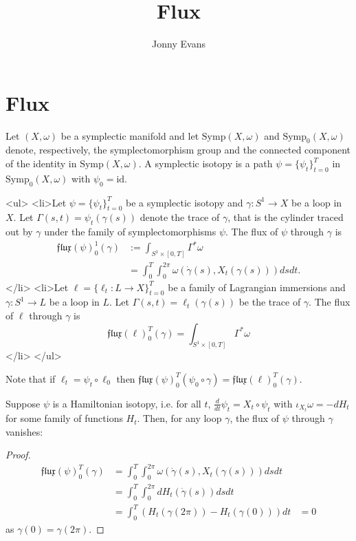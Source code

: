 \documentclass{article}
\title{Flux}
\author{Jonny Evans}
\begin{document}
\section{Flux}

Let $(X,\omega)$ be a symplectic manifold and let $\mathrm{Symp}(X,\omega)$ and $\mathrm{Symp}_0(X,\omega)$ denote, respectively, the symplectomorphism group and the connected component of the identity in $\mathrm{Symp}(X,\omega)$. A symplectic isotopy is a path $\psi=\{\psi_t\}_{t=0}^T$ in $\mathrm{Symp}_0(X,\omega)$ with $\psi_0=\mathrm{id}$.

\begin{Definition}
  <ul>
  <li>Let $\psi=\{\psi_t\}_{t=0}^T$ be a symplectic isotopy and $\gamma\colon S^1\to X$ be a loop in $X$. Let $\Gamma(s,t)=\psi_t(\gamma(s))$ denote the trace of $\gamma$, that is the cylinder traced out by $\gamma$ under the family of symplectomorphisms $\psi$. The flux of $\psi$ through $\gamma$ is
      \[\begin{align*}
        \mathfrak{flux}(\psi)_0^1(\gamma)&:=\int_{S^1\times[0,T]}\Gamma^*\omega\\
        &=\int_0^T\int_0^{2\pi}\omega(\dot{\gamma}(s),X_t(\gamma(s)))ds dt.
      \end{align*}\]
      </li>
      <li>Let $\ell=\{\ell_t\colon L\to X\}_{t=0}^T$ be a family of Lagrangian immersions and $\gamma\colon S^1\to L$ be a loop in $L$. Let $\Gamma(s,t)=\ell_t(\gamma(s))$ be the trace of $\gamma$. The flux of $\ell$ through $\gamma$ is
      \[\mathfrak{flux}(\ell)_0^T(\gamma)=\int_{S^1\times[0,T]}\Gamma^*\omega\]
      </li>
      </ul>
\end{Definition}

Note that if $\ell_t=\psi_t\circ\ell_0$ then $\mathfrak{flux}(\psi)_0^T(\psi_0\circ\gamma)=\mathfrak{flux}(\ell)_0^T(\gamma)$.

\begin{Lemma}
  Suppose $\psi$ is a Hamiltonian isotopy, i.e. for all $t$, $\frac{d}{dt}\psi_t=X_t\circ\psi_t$ with $\iota_{X_t}\omega=-dH_t$ for some family of functions $H_t$. Then, for any loop $\gamma$, the flux of $\psi$ through $\gamma$ vanishes:
\end{Lemma}
\begin{proof}
  \begin{align*}
    \mathfrak{flux}(\psi)_0^T(\gamma)&=\int_0^T\int_0^{2\pi}\omega(\dot{\gamma}(s),X_t(\gamma(s)))ds dt\\
    &=\int_0^T\int_0^{2\pi}dH_t(\dot{\gamma}(s))dsdt\\
    &=\int_0^T(H_t(\gamma(2\pi))-H_t(\gamma(0)))dt
    &=0
  \end{align*}
  as $\gamma(0)=\gamma(2\pi)$.
\end{proof}
\end{document}

